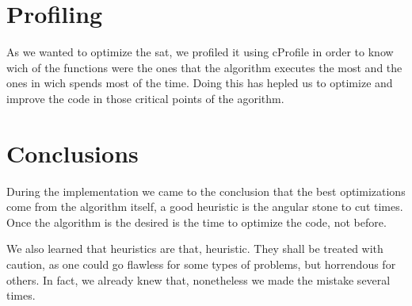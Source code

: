 \documentclass{article}
\begin{document}
\section{Profiling}
%
As we wanted to optimize the sat, we profiled it using cProfile in order to know wich of the functions were the ones that the algorithm executes the most and the ones in wich spends most of the time. Doing this has hepled us to optimize and improve the code in those critical points of the agorithm.
\section{Conclusions}
During the implementation we came to the conclusion that the best optimizations come from the algorithm
itself, a good heuristic is the angular stone to cut times. 
Once the algorithm is the desired is the time to optimize the code, not before.

We also learned that heuristics are that, heuristic. They shall be treated with caution, as one could
go flawless for some types of problems, but horrendous for others. In fact, we already knew that, nonetheless
we made the mistake several times.
\end{document}
